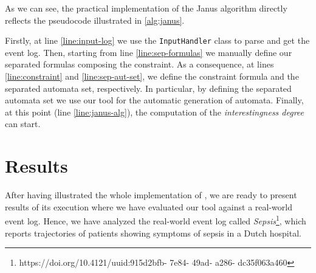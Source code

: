 As we can see, the practical implementation of the Janus algorithm directly reflects the pseudocode illustrated in \ref{alg:janus}. 

Firstly, at line \ref{line:input-log} we use the \texttt{InputHandler} class to parse and get the event log. Then, starting from line \ref{line:sep-formulas} we manually define our separated formulas composing the constraint. As a consequence, at lines \ref{line:constraint} and \ref{line:sep-aut-set}, we define the constraint formula and the separated automata set, respectively. In particular, by defining the separated automata set we use our tool \LTLfToDFA for the automatic generation of automata. Finally, at this point (line \ref{line:janus-alg}), the computation of the \textit{interestingness degree} can start.
\section{Results}
After having illustrated the whole implementation of \janus, we are ready to present results of its execution where we have evaluated our tool against a real-world event log. Hence, we have analyzed the real-world event log called \textit{Sepsis}\footnote{https://doi.org/10.4121/uuid:915d2bfb- 7e84- 49ad- a286- dc35f063a460}, which reports trajectories of patients showing symptoms of sepsis in a Dutch hospital.

